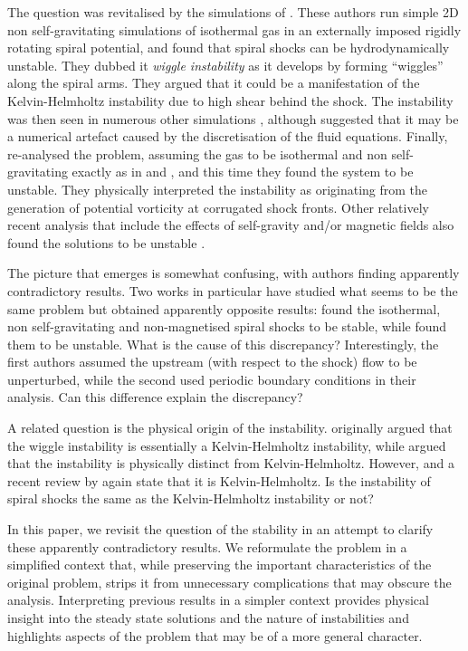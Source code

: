 \documentclass[useAMS,usenatbib]{mn2e}
\begin{document}
The question was revitalised by the simulations of \cite{WadaKoda2004}. These authors run simple 2D non self-gravitating simulations of isothermal gas in an externally imposed rigidly rotating spiral potential, and found that spiral shocks can be hydrodynamically unstable. They dubbed it \emph{wiggle instability} as it develops by forming ``wiggles'' along the spiral arms. They argued that it could be a manifestation of the Kelvin-Helmholtz instability due to high shear behind the shock. The instability was then seen in numerous other simulations \citep[e.g.][]{DobbsBonnell2006,Kim++2012a,KimKim2014,SBM2015a,KhoperskovBertin2015}, although \cite{HanawaKicuchi2012} suggested that it may be a numerical artefact caused by the discretisation of the fluid equations. Finally, \cite{KimKimKim2014} re-analysed the problem, assuming the gas to be isothermal and non self-gravitating exactly as in \cite{Roberts1969} and \cite{DwarkadasBalbus1996}, and this time they found the system to be unstable. They physically interpreted the instability as originating from the generation of potential vorticity at corrugated shock fronts. Other relatively recent analysis that include the effects of self-gravity and/or magnetic fields also found the solutions to be unstable \citep{LeeShu2012,KimKimElmegreen2015}.

The picture that emerges is somewhat confusing, with authors finding apparently contradictory results. Two works in particular have studied what seems to be the same problem but obtained apparently opposite results: \cite{DwarkadasBalbus1996} found the isothermal, non self-gravitating and non-magnetised spiral shocks to be stable, while \cite{KimKimKim2014} found them to be unstable. What is the cause of this discrepancy? Interestingly, the first authors assumed the upstream (with respect to the shock) flow to be unperturbed, while the second used periodic boundary conditions in their analysis. Can this difference explain the discrepancy?

A related question is the physical origin of the instability. \cite{WadaKoda2004} originally argued that the wiggle instability is essentially a Kelvin-Helmholtz instability, while \cite{KimKimKim2014} argued that the instability is physically distinct from Kelvin-Helmholtz. However, \cite{KhoperskovBertin2015} and a recent review by \cite{Shu2016} again state that it is Kelvin-Helmholtz. Is the instability of spiral shocks the same as the Kelvin-Helmholtz instability or not?

In this paper, we revisit the question of the stability in an attempt to clarify these apparently contradictory results. We reformulate the problem in a simplified context that, while preserving the important characteristics of the original problem, strips it from unnecessary complications that may obscure the analysis. Interpreting previous results in a simpler context provides physical insight into the steady state solutions and the nature of instabilities and highlights aspects of the problem that may be of a more general character.
\end{document}
